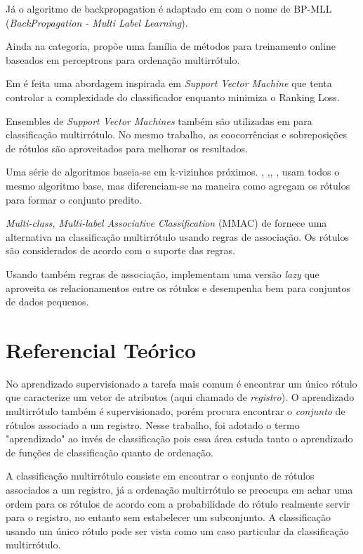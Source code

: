 \documentclass[runningheads,a4paper]{llncs}
\begin{document}
Já o algoritmo de backpropagation é adaptado em \cite{Zhang2006-vf} com o nome de BP-MLL (\textit{BackPropagation - Multi Label Learning}).

Ainda na categoria, \cite{Crammer2003-su} propõe uma família de métodos para treinamento online baseados em perceptrons para ordenação multirrótulo.

Em \cite{Elisseeff2001-lp} é feita uma abordagem inspirada em \textit{Support Vector Machine} que tenta controlar a complexidade do classificador enquanto minimiza o Ranking Loss.

Ensembles de \textit{Support Vector Machines} também são utilizadas em \cite{Godbole2004-su} para classificação multirrótulo. No mesmo trabalho, as coocorrências e sobreposições de rótulos são aproveitados para melhorar os resultados.

Uma série de algoritmos baseia-se em k-vizinhos próximos. \cite{Zhang2007-id}, \cite{Luo2005-ac},\cite{Wieczorkowska2006-am}, \cite{Spyromitros2008-rs}, usam todos o mesmo algoritmo base, mas diferenciam-se na maneira como agregam os rótulos para formar o conjunto predito.
 
\textit{Multi-class, Multi-label Associative Classification} (MMAC) de \cite{Thabtah2004-vz} fornece uma alternativa na classificação multirrótulo usando regras de associação. Os rótulos são considerados de acordo com o suporte das regras.

Usando também regras de associação, \cite{Veloso2007-el} implementam uma versão \textit{lazy} que aproveita os relacionamentos entre os rótulos e desempenha bem para conjuntos de dados pequenos.

\section{Referencial Teórico}\label{sec:refteo}

No aprendizado supervisionado a tarefa mais comum é encontrar um único rótulo que  caracterize um vetor de atributos (aqui chamado de \emph{registro}). O aprendizado multirrótulo também é supervisionado, porém procura encontrar o \emph{conjunto} de rótulos associado a um registro. Nesse trabalho, foi adotado o termo "aprendizado" ao invés de classificação pois essa área estuda tanto o aprendizado de funções de classificação quanto de ordenação\cite{Zhang2014-be}.

A classificação multirrótulo consiste em encontrar o conjunto de rótulos associados a um registro, já a ordenação multirrótulo se preocupa em achar uma ordem para os rótulos de acordo com a probabilidade do rótulo realmente servir para o registro, no entanto sem estabelecer um subconjunto. A classificação usando um único rótulo pode ser vista como um caso particular da classificação multirrótulo.
\end{document}
